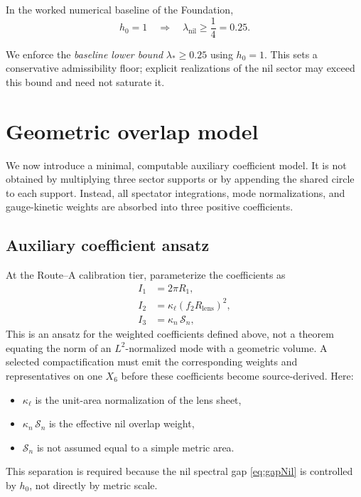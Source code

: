 \documentclass[11pt]{article}
\begin{document}
In the worked numerical baseline of the Foundation,
\begin{equation}
h_0 = 1
\quad\Rightarrow\quad
\lambda_{\mathrm{nil}} \ge \frac{1}{4} = 0.25.
\end{equation}

We enforce the \emph{baseline lower bound} $\lambda_{\ast}\ge 0.25$ using $h_0=1$.
This sets a conservative admissibility floor; explicit realizations of the nil sector may
exceed this bound and need not saturate it.


\section{Geometric overlap model}

We now introduce a minimal, computable auxiliary coefficient model. It is not
obtained by multiplying three sector supports or by appending the shared circle
to each support. Instead, all spectator integrations, mode normalizations, and
gauge-kinetic weights are absorbed into three positive coefficients.

\subsection{Auxiliary coefficient ansatz}

At the Route--A calibration tier, parameterize the coefficients as
\begin{align}
I_1 &= 2\pi R_1,
\label{eq:I1}\\
I_2 &= \kappa_\ell (f_2R_{\mathrm{lens}})^2,
\label{eq:I2}\\
I_3 &= \kappa_n\,\mathcal{S}_n,
\label{eq:I3}
\end{align}
This is an ansatz for the weighted coefficients defined above, not a theorem
equating the norm of an $L^2$-normalized mode with
a geometric volume. A selected compactification must emit the corresponding
weights and representatives on one $X_6$ before these coefficients become
source-derived. Here:
\begin{itemize}
\item $\kappa_\ell$ is the unit-area normalization of the lens sheet,
\item $\kappa_n\,\mathcal{S}_n$ is the effective nil overlap weight,
\item $\mathcal{S}_n$ is not assumed equal to a simple metric area.
\end{itemize}

This separation is required because the nil spectral gap
\eqref{eq:gapNil} is controlled by $h_0$, not directly by metric scale.
\end{document}

